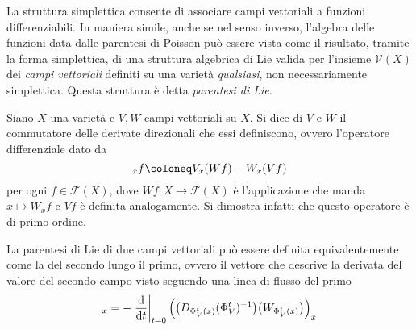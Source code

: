 La struttura simplettica consente di associare campi vettoriali a funzioni differenziabili. In maniera simile, anche se nel senso inverso, l'algebra delle funzioni data dalle parentesi di Poisson può essere vista come il risultato, tramite la forma simplettica, di una struttura algebrica di Lie valida per l'insieme $\mathcal{V}(X)$ dei \emph{campi vettoriali} definiti su una varietà \emph{qualsiasi}, non necessariamente simplettica. Questa struttura è detta \emph{parentesi di Lie}.
\begin{definition}
  Siano $X$ una varietà e $V,W$ campi vettoriali su $X$. Si dice  di $V$ e $W$ il commutatore delle derivate direzionali che essi definiscono, ovvero l'operatore differenziale dato da
  \begin{equation}
  [V,W]_x f\defeq V_x (W f) - W_x (V f)
  \end{equation}
  per ogni $f \in \mathcal{F}(X)$, dove $Wf: X \to \mathcal{F}(X)$ è l'applicazione che manda $x \mapsto W_x f$ e $Vf$ è definita analogamente. Si dimostra infatti che questo operatore è di primo ordine.
\end{definition}
\begin{remark}
  La parentesi di Lie di due campi vettoriali può essere definita equivalentemente come la  del secondo lungo il primo, ovvero il vettore che descrive la derivata del valore del secondo campo visto seguendo una linea di flusso del primo
  \begin{equation}
    [V,W]_x = - \eval{\dv{t}}_{t=0} \Big(\big(D_{\Phi_V^t(x)} (\Phi_V^t)^{-1}\big)\big(W_{\Phi_V^t(x)}\big) \Big)_x
    \end{equation}
\end{remark}
